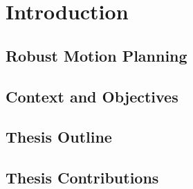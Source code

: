 \chapter{Introduction}

\section{Robust Motion Planning}

\section{Context and Objectives}

\section{Thesis Outline}

\section{Thesis Contributions}

\todomarker{}